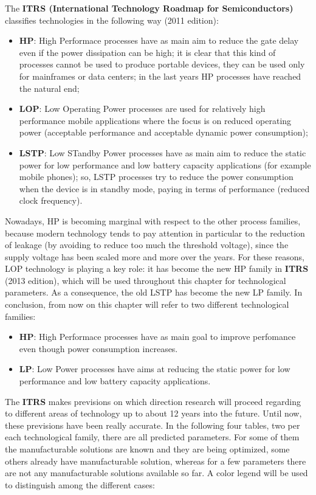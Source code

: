 \documentclass[a4paper, 12pt, twoside, openright]{report}
\begin{document}
The \textbf{ITRS (International Technology Roadmap for Semiconductors)} classifies technologies in the following way (2011 edition):

	\begin{itemize}
	\item \textbf{HP}: High Performace processes have as main aim to reduce the gate delay even if the power dissipation can be high; it is clear that this kind of processes cannot be used to produce portable devices, they can be used only for mainframes or data centers; in the last years HP processes have reached the natural end;
	\item \textbf{LOP}: Low Operating Power processes are used for relatively high performance mobile applications where the focus is on reduced operating power (acceptable performance and acceptable dynamic power consumption);
	\item \textbf{LSTP}: Low STandby Power processes have as main aim to reduce the static power for low performance and low battery capacity applications (for example mobile phones); so, LSTP processes try to reduce the power consumption when the device is in standby mode, paying in terms of performance (reduced clock frequency).
	\end{itemize}

Nowadays, HP is becoming marginal with respect to the other process families, because modern technology tends to pay attention in particular to the reduction of leakage (by avoiding to reduce too much the threshold voltage), since the supply voltage has been scaled more and more over the years. For these reasons, LOP technology is playing a key role: it has become the new HP family in \textbf{ITRS} (2013 edition), which will be used throughout this chapter for technological parameters. As a consequence, the old LSTP has become the new LP family. In conclusion, from now on this chapter will refer to two different technological families:

\begin{itemize}
\item \textbf{HP}: High Performace processes have as main goal to improve perfomance even though power consumption increases.
\item \textbf{LP}: Low Power processes have aims at reducing the static power for low performance and low battery capacity applications.
\end{itemize}

The \textbf{ITRS} makes previsions on which direction research will proceed regarding to different areas of technology up to about 12 years into the future. Until now, these previsions have been really accurate. In the following four tables, two per each technological family, there are all predicted parameters. For some of them the manufacturable solutions are known and they are being optimized, some others already have manufacturable solution, whereas for a few parameters there are not any manufacturable solutions available so far. A color legend will be used to distinguish among the different cases:
\end{document}
